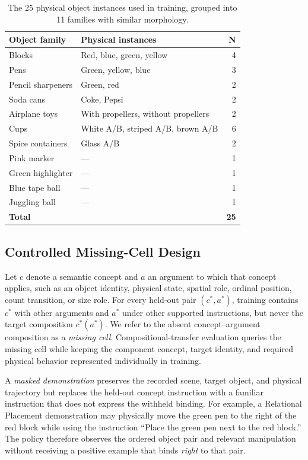 \begin{table}[t]
\centering
\small
\caption{The 25 physical object instances used in training, grouped into 11 families with similar morphology.}
\label{tab:objects}
\begin{tabular}{@{}p{}p{}r@{}}
\toprule
\textbf{Object family} & \textbf{Physical instances} & \textbf{N} \\
\midrule
Blocks & Red, blue, green, yellow & 4 \\
Pens & Green, yellow, blue & 3 \\
Pencil sharpeners & Green, red & 2 \\
Soda cans & Coke, Pepsi & 2 \\
Airplane toys & With propellers, without propellers & 2 \\
Cups & White A/B, striped A/B, brown A/B & 6 \\
Spice containers & Glass A/B & 2 \\
Pink marker & --- & 1 \\
Green highlighter & --- & 1 \\
Blue tape ball & --- & 1 \\
Juggling ball & --- & 1 \\
\midrule
\textbf{Total} & & \textbf{25} \\
\bottomrule
\end{tabular}
\end{table}

\subsection{Controlled Missing-Cell Design}

Let $c$ denote a semantic concept and $a$ an argument to which that concept applies, such as an object identity, physical state, spatial role, ordinal position, count transition, or size role. For every held-out pair $(c^{\ast},a^{\ast})$, training contains $c^{\ast}$ with other arguments and $a^{\ast}$ under other supported instructions, but never the target composition $c^{\ast}(a^{\ast})$. We refer to the absent concept--argument composition as a \emph{missing cell}. Compositional-transfer evaluation queries the missing cell while keeping the component concept, target identity, and required physical behavior represented individually in training.

A \emph{masked demonstration} preserves the recorded scene, target object, and physical trajectory but replaces the held-out concept instruction with a familiar instruction that does not express the withheld binding. For example, a Relational Placement demonstration may physically move the green pen to the right of the red block while using the instruction ``Place the green pen next to the red block.'' The policy therefore observes the ordered object pair and relevant manipulation without receiving a positive example that binds \emph{right} to that pair.

